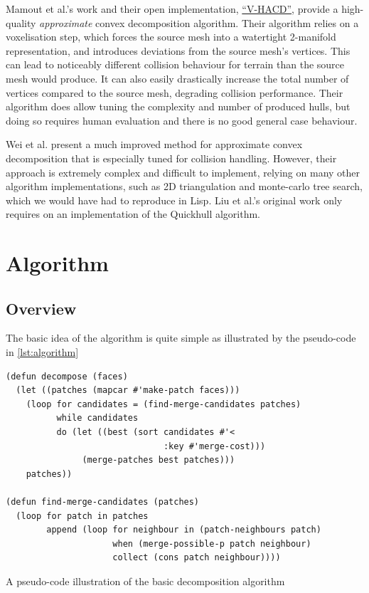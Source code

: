 \documentclass[format=sigconf]{acmart}
\begin{document}
Mamout et al.\cite{mamou2016volumetric}'s work and their open implementation, \href{https://github.com/kmammou/v-hacd}{``V-HACD''}, provide a high-quality \textit{approximate} convex decomposition algorithm. Their algorithm relies on a voxelisation step, which forces the source mesh into a watertight 2-manifold representation, and introduces deviations from the source mesh's vertices. This can lead to noticeably different collision behaviour for terrain than the source mesh would produce. It can also easily drastically increase the total number of vertices compared to the source mesh, degrading collision performance. Their algorithm does allow tuning the complexity and number of produced hulls, but doing so requires human evaluation and there is no good general case behaviour.

Wei et al.\cite{wei2022coacd} present a much improved method for approximate convex decomposition that is especially tuned for collision handling. However, their approach is extremely complex and difficult to implement, relying on many other algorithm implementations, such as 2D triangulation and monte-carlo tree search, which we would have had to reproduce in Lisp. Liu et al.'s original work only requires on an implementation of the Quickhull\cite{barber1996quickhull} algorithm.

\section{Algorithm}\label{algorithm}
\subsection{Overview}
The basic idea of the algorithm is quite simple as illustrated by the pseudo-code in \autoref{lst:algorithm}

\begin{listing}[h]
\begin{verbatim}
(defun decompose (faces)
  (let ((patches (mapcar #'make-patch faces)))
    (loop for candidates = (find-merge-candidates patches)
          while candidates
          do (let ((best (sort candidates #'<
                               :key #'merge-cost)))
               (merge-patches best patches)))
    patches))

(defun find-merge-candidates (patches)
  (loop for patch in patches
        append (loop for neighbour in (patch-neighbours patch)
                     when (merge-possible-p patch neighbour)
                     collect (cons patch neighbour))))
\end{verbatim}
\caption{A pseudo-code illustration of the basic decomposition algorithm}
\label{lst:algorithm}
\end{listing}
\end{document}
